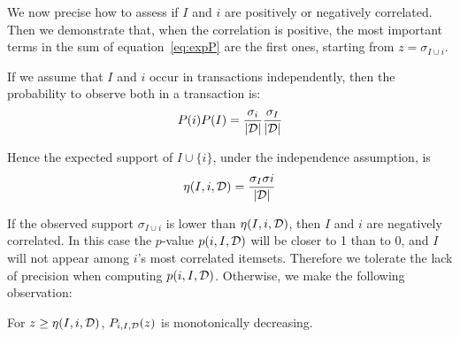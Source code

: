 We now precise how to assess if $I$ and $i$ are positively or negatively correlated.
Then we demonstrate that, when the correlation is positive,
the most important terms in the sum of equation~\ref{eq:expP} are the first ones,
starting from $z=\sigma_{I \cup i}$.

If we assume that $I$ and $i$ occur in transactions independently,
then the probability to observe both in a transaction is:
\begin{equation*}
	P(i)P(I) = \frac{\sigma_{i}}{|{\cal D}|}\frac{\sigma_{I}}{|{\cal D}|}
\end{equation*}

Hence the expected support of $I \cup \{i\}$, under the independence assumption, is
\begin{equation*}
	\eta(I,i,{\cal D}) = \frac{\sigma_{I}\sigma{i}}{|{\cal D}|}
\end{equation*}

If the observed support $\sigma_{I \cup i}$ is lower than
$\eta(I,i,{\cal D})$,
then $I$ and $i$ are negatively correlated.
In this case the $p$-value $p(i,I,{\cal D})$ will be closer to 1 than to 0,
and $I$ will not appear among $i$'s most correlated itemsets.
Therefore we tolerate the lack of precision when computing $p(i,I,{\cal D})$.
Otherwise, we make the following observation:

\begin{property}
  \label{prop:Pdecrease}
  For $z \geq \eta(I,i,{\cal D})$,
  $P_{i,I,{\cal D}}(z)$ is monotonically decreasing.
\end{property}

